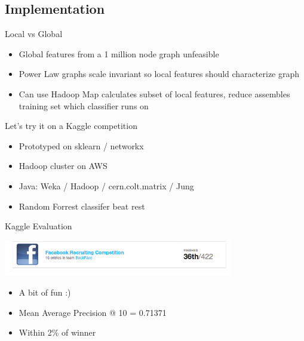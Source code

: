 \documentclass{beamer}
\begin{document}
\subsection{Implementation}

\begin{frame}{Local vs Global}

  \begin{itemize}
	\item Global features from a 1 million node graph unfeasible  
	\pause
	\item Power Law graphs scale invariant so local features should characterize graph 
	\pause
	\item Can use Hadoop Map calculates subset of local features, reduce assembles training set which classifier runs on 
  \end{itemize}
\end{frame}

\begin{frame}{Let's try it on a Kaggle competition}
  \begin{itemize}
  	\item Prototyped on sklearn / networkx
   	\item Hadoop cluster on AWS
   	\item Java: Weka / Hadoop / cern.colt.matrix / Jung
   	\item Random Forrest classifer beat rest
  \end{itemize}
\end{frame}



\begin{frame}{Kaggle Evaluation}

\includegraphics[width=10cm]{kaggle}

  \begin{itemize}
	\item A bit of fun :)
	\pause
	\item  Mean Average Precision @ 10 = 0.71371
	\pause
	\item  Within 2\% of winner
  \end{itemize}
  
\end{frame}
\end{document}
